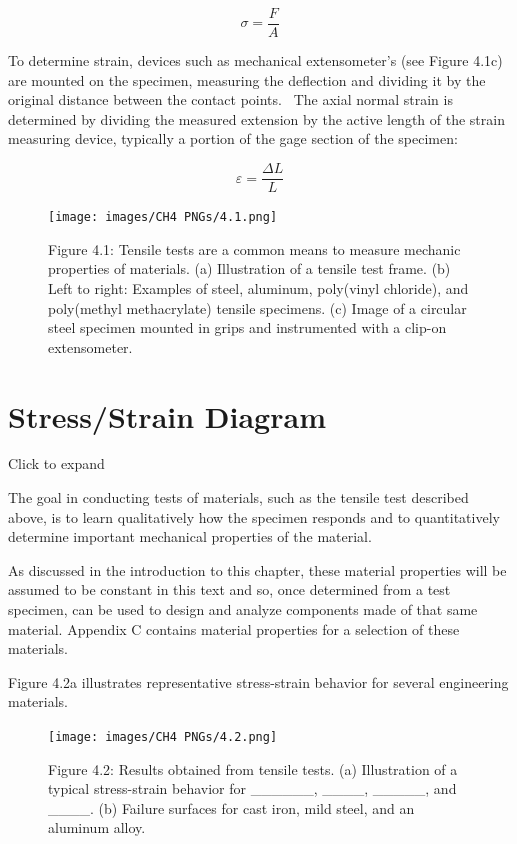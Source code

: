 \documentclass[
  letterpaper,
  DIV=11,
  numbers=noendperiod]{scrreprt}
\theoremstyle{definition}
\theoremstyle{remark}
\begin{document}
\[
\sigma=\frac{F}{A}
\]

To determine strain, devices such as mechanical extensometer's (see
Figure 4.1c) are mounted on the specimen, measuring the deflection and
dividing it by the original distance between the contact points.~ The
axial normal strain is determined by dividing the measured extension by
the active length of the strain measuring device, typically a portion of
the gage section of the specimen:

\[
\varepsilon=\frac{\Delta L}{L}
\]

\begin{figure}[H]

{\centering \texttt{[image: images/CH4 PNGs/4.1.png]}

}

\caption{Figure 4.1: Tensile tests are a common means to measure
mechanic properties of materials. (a) Illustration of a tensile test
frame. (b) Left to right: Examples of steel, aluminum, poly(vinyl
chloride), and poly(methyl methacrylate) tensile specimens. (c) Image of
a circular steel specimen mounted in grips and instrumented with a
clip-on extensometer.}

\end{figure}%

\section{Stress/Strain Diagram}\label{sec-4.2}

Click to expand

The goal in conducting tests of materials, such as the tensile test
described above, is to learn qualitatively how the specimen responds and
to quantitatively determine important mechanical properties of the
material.

As discussed in the introduction to this chapter, these material
properties will be assumed to be constant in this text and so, once
determined from a test specimen, can be used to design and analyze
components made of that same material. Appendix C contains material
properties for a selection of these materials.

Figure 4.2a illustrates representative stress-strain behavior for
several engineering materials.

\begin{figure}[H]

{\centering \texttt{[image: images/CH4 PNGs/4.2.png]}

}

\caption{Figure 4.2: Results obtained from tensile tests. (a)
Illustration of a typical stress-strain behavior for \_\_\_\_\_\_,
\_\_\_\_, \_\_\_\_\_, and \_\_\_\_. (b) Failure surfaces for cast iron,
mild steel, and an aluminum alloy.}

\end{figure}%
\end{document}
